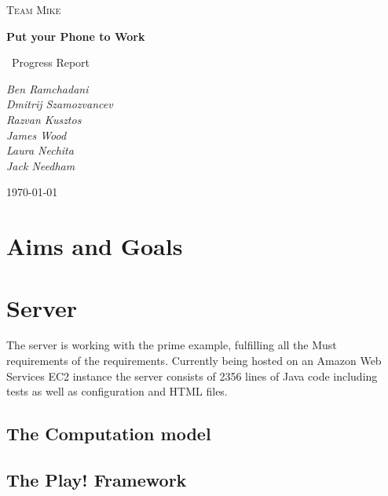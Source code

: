 \documentclass[a4paper,10pt]{article}
\title{}
\author{}
\date{}
\begin{document}
\begin{titlepage}
	\centering
	
	{\scshape\Large Team Mike\par}
	\vspace{4cm}
	{\huge\bfseries Put your Phone to Work\par}
	\vspace{1.5cm}
	{\Large\
	Progress Report
	\par}
	\vspace{2cm}
	{\Large\itshape 
	      Ben Ramchadani\\
	      Dmitrij Szamozvancev\\
	      Razvan Kusztos\\
	      James Wood \\
	      Laura Nechita \\
	      Jack Needham
	      \par}
	\vfill

	{\large \today\par}
\end{titlepage}
\maketitle
\tableofcontents
\newpage
\section{Aims and Goals}
\section{Server}

The server is working with the prime example, fulfilling all the Must requirements of the requirements.
Currently being hosted on an Amazon Web Services EC2 instance the server consists of 2356 lines of Java code including tests
as well as configuration and HTML files.

\subsection{The Computation model}



\subsection{The Play! Framework}
\end{document}
